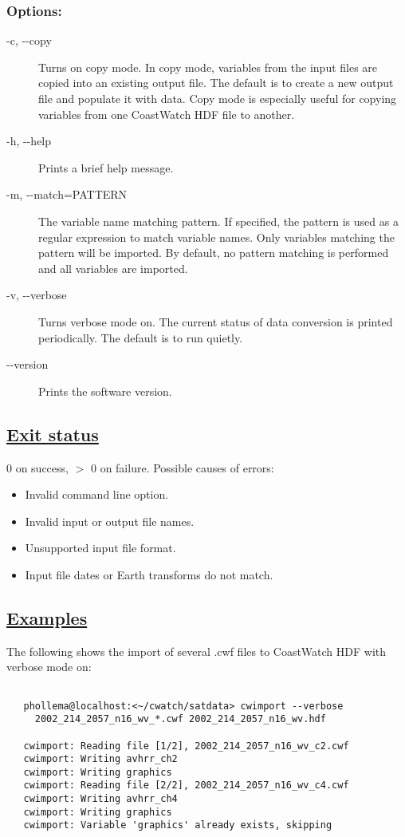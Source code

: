 \subsubsection*{Options:}
\begin{description}
\item[ -c, -{-}copy ] Turns on copy mode. In copy mode, variables from the input files are copied into an existing output file. The default is to create a new output file and populate it with data. Copy mode is especially useful for copying variables from one CoastWatch HDF file to another.
\item[ -h, -{-}help ] Prints a brief help message. 
\item[ -m, -{-}match=PATTERN ] The variable name matching pattern. If specified, the pattern is used as a regular expression to match variable names. Only variables matching the pattern will be imported. By default, no pattern matching is performed and all variables are imported. 
\item[ -v, -{-}verbose ] Turns verbose mode on. The current status of data conversion is printed periodically. The default is to run quietly. 
\item[-{-}version]Prints the software version.

\end{description}
\subsection*{\underline{Exit status}}


  0 on success, $>$ 0 on failure. Possible causes of errors: \begin{itemize}
\item  Invalid command line option. 
\item  Invalid input or output file names. 
\item  Unsupported input file format. 
\item  Input file dates or Earth transforms do not match. 

\end{itemize}

\subsection*{\underline{Examples}}


  The following shows the import of several .cwf files to CoastWatch HDF with verbose mode on: \begin{verbatim}

   phollema@localhost:<~/cwatch/satdata> cwimport --verbose
     2002_214_2057_n16_wv_*.cwf 2002_214_2057_n16_wv.hdf

   cwimport: Reading file [1/2], 2002_214_2057_n16_wv_c2.cwf
   cwimport: Writing avhrr_ch2
   cwimport: Writing graphics
   cwimport: Reading file [2/2], 2002_214_2057_n16_wv_c4.cwf
   cwimport: Writing avhrr_ch4
   cwimport: Writing graphics
   cwimport: Variable 'graphics' already exists, skipping
 
\end{verbatim}



